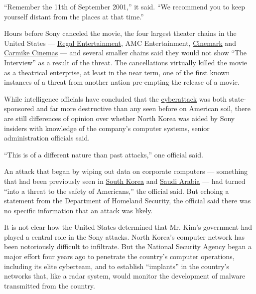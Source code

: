 ``Remember the 11th of September 2001,'' it said. ``We recommend you to
keep yourself distant from the places at that time.''

Hours before Sony canceled the movie, the four largest theater chains in
the United States ---
\href{http://topics.nytimes3xbfgragh.onion/top/news/business/companies/regal-entertainment-group/index.html?module=Search\&mabReward=relbias\%3Aw\%2C\%7B\%221\%22\%3A\%22RI\%3A8\%22\%7D}{Regal
Entertainment}, AMC Entertainment,
\href{http://topics.nytimes3xbfgragh.onion/top/news/business/companies/cinemark-holdings-inc/index.html}{Cinemark}
and
\href{http://topics.nytimes3xbfgragh.onion/top/news/business/companies/carmike-cinemas-inc/index.html}{Carmike
Cinemas} --- and several smaller chains said they would not show ``The
Interview'' as a result of the threat. The cancellations virtually
killed the movie as a theatrical enterprise, at least in the near term,
one of the first known instances of a threat from another nation
pre-empting the release of a movie.

While intelligence officials have concluded that the
\href{http://www.nytimes3xbfgragh.onion/2014/12/03/business/media/sony-is-again-target-of-hackers.html}{cyberattack}
was both state-sponsored and far more destructive than any seen before
on American soil, there are still differences of opinion over whether
North Korea was aided by Sony insiders with knowledge of the company's
computer systems, senior administration officials said.

``This is of a different nature than past attacks,'' one official said.

An attack that began by wiping out data on corporate computers ---
something that had been previously seen in
\href{http://www.nytimes3xbfgragh.onion/2013/03/21/world/asia/south-korea-computer-network-crashes.html?pagewanted=all\&module=Search\&mabReward=relbias\%3Ar\%2C\%7B\%221\%22\%3A\%22RI\%3A8\%22\%7D}{South
Korea} and
\href{http://www.nytimes3xbfgragh.onion/2012/10/14/world/middleeast/us-suspects-iranians-were-behind-a-wave-of-cyberattacks.html?pagewanted=all\&module=Search\&mabReward=relbias\%3Ar\%2C\%7B\%221\%22\%3A\%22RI\%3A8\%22\%7D}{Saudi
Arabia} --- had turned ``into a threat to the safety of Americans,'' the
official said. But echoing a statement from the Department of Homeland
Security, the official said there was no specific information that an
attack was likely.

It is not clear how the United States determined that Mr. Kim's
government had played a central role in the Sony attacks. North Korea's
computer network has been notoriously difficult to infiltrate. But the
National Security Agency began a major effort four years ago to
penetrate the country's computer operations, including its elite
cyberteam, and to establish ``implants'' in the country's networks that,
like a radar system, would monitor the development of malware
transmitted from the country.

